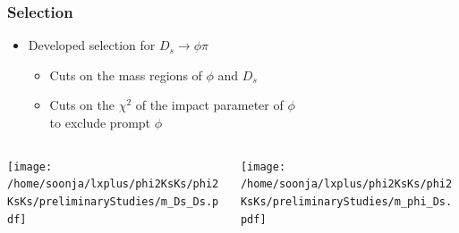 \documentclass{beamer}
\begin{document}
\begin{frame}
\frametitle{Selection}

\begin{itemize}
\item Developed selection for $D_s \rightarrow \phi \pi$
\begin{itemize}
\item Cuts on the mass regions of $\phi$ and $D_s$
\item Cuts on the $\chi^2$ of the impact parameter of  $\phi$\\ to exclude prompt $\phi$
\end{itemize}
\end{itemize}
\vspace*{-.2cm}
\begin{columns}
\begin{column}{.5\columnwidth}
\texttt{[image: /home/soonja/lxplus/phi2KsKs/phi2KsKs/preliminaryStudies/m\_Ds\_Ds.pdf]}
\end{column}
\begin{column}{.5\columnwidth}
\texttt{[image: /home/soonja/lxplus/phi2KsKs/phi2KsKs/preliminaryStudies/m\_phi\_Ds.pdf]}
\end{column}
\end{columns}
\end{frame}
\end{document}
